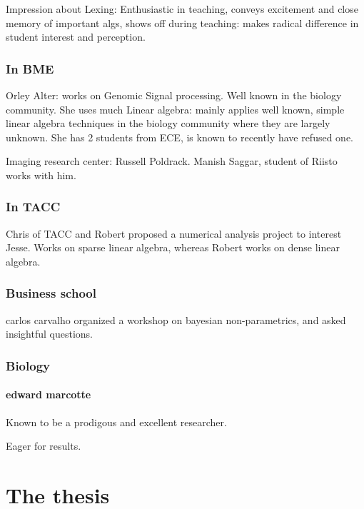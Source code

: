 \documentclass[oneside, article]{memoir}
\begin{document}
\subitem Impression about Lexing: Enthusiastic in teaching, conveys excitement and close memory of important algs, shows off during teaching: makes radical difference in student interest and perception.

\subsection{In BME}

Orley Alter: works on Genomic Signal processing. Well known in the biology community. She uses much Linear algebra: mainly applies well known, simple linear algebra techniques in the biology community where they are largely unknown. She has 2 students from ECE, is known to recently have refused one.

Imaging research center: Russell Poldrack. Manish Saggar, student of Riisto works with him.

\subsection{In TACC}
Chris of TACC and Robert proposed a numerical analysis project to interest Jesse. Works on sparse linear algebra, whereas Robert works on dense linear algebra.

\subsection{Business school}
carlos carvalho organized a workshop on bayesian non-parametrics, and asked insightful questions.

\subsection{Biology}
\subsubsection{edward marcotte}
Known to be a prodigous and excellent researcher.

Eager for results.

\chapter{The thesis}
\end{document}

